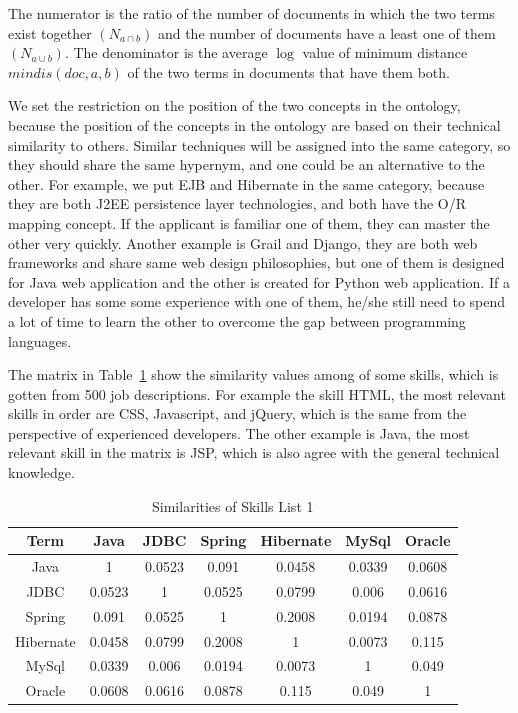 The numerator is the ratio of the number of documents in which the two terms exist together $(N_{a \cap b})$ and the number of documents have a least one of them $(N_{a \cup b})$. The denominator is the average $\log$ value of minimum distance $mindis(doc,a,b)$ of the two terms in documents that have them both.

We set the restriction on the position of the two concepts in the ontology, because the position of the concepts in the ontology are based on their technical similarity to others. Similar techniques will be assigned into the same category, so they should share the same hypernym, and one could be an alternative to the other. For example, we put EJB and Hibernate in the same category, because they are both J2EE persistence layer technologies, and both have the O/R mapping concept. If the applicant is familiar one of them, they can master the other very quickly. Another example is Grail and Django, they are both web frameworks and share same web design philosophies, but one of them is designed for Java web application and the other is created for Python web application. If a developer has some some experience with one of them, he/she still need to spend a lot of time to learn the other to overcome the gap between programming languages. 

The matrix in Table~\ref{tab:dismatrix1} show the similarity values among of some skills, which is gotten from 500 job descriptions. For example the skill HTML, the most relevant skills in order are CSS, Javascript, and jQuery,  which is the same from the perspective of experienced developers. The other example is Java, the most relevant skill in the matrix is JSP, which is also agree with the general technical knowledge.


\begin{table}

\caption{Similarities of Skills List 1}
\begin{tabular}{ c | c c c c c c   }
 \hline
  Term       &  Java  &  JDBC  & Spring & Hibernate & MySql  & Oracle   \\  \hline
  Java   &   1    & 0.0523 & 0.091  &   0.0458  & 0.0339 & 0.0608    \\  \hline
    JDBC   & 0.0523 &   1    & 0.0525 &   0.0799  & 0.006  & 0.0616   \\  \hline
   Spring  & 0.091  & 0.0525 &   1    &   0.2008  & 0.0194 & 0.0878   \\  \hline
 Hibernate & 0.0458 & 0.0799 & 0.2008 &     1     & 0.0073 & 0.115    \\  \hline
   MySql   & 0.0339 & 0.006  & 0.0194 &   0.0073  &   1    & 0.049    \\  \hline
   Oracle  & 0.0608 & 0.0616 & 0.0878 &   0.115   & 0.049  &   1      \\  \hline
 \hline
\end{tabular}
\label{tab:dismatrix1}
\end{table}



